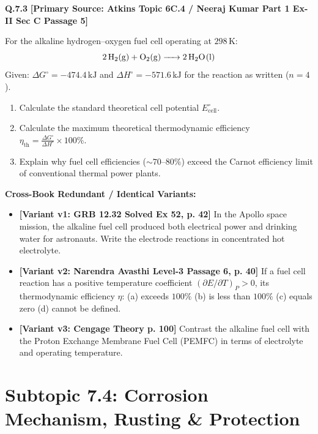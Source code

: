 \begin{problembox}
\textbf{Q.7.3} \hfill \textbf{[Primary Source: Atkins Topic 6C.4 / Neeraj Kumar Part 1 Ex-II Sec C Passage 5]}
\label{q:qb-c7-03}

For the alkaline hydrogen--oxygen fuel cell operating at $298\,\text{K}$:
\begin{equation*}
    \ce{2H2(g) + O2(g) -> 2H2O(l)}
\end{equation*}
Given: $\Delta G^\circ = -474.4\,\text{kJ}$ and $\Delta H^\circ = -571.6\,\text{kJ}$ for the reaction as written ($n = 4$).
\begin{enumerate}[label=(\alph*)]
    \item Calculate the standard theoretical cell potential $E^\circ_{\text{cell}}$.
    \item Calculate the maximum theoretical thermodynamic efficiency $\eta_{\text{th}} = \frac{\Delta G^\circ}{\Delta H^\circ} \times 100\%$.
    \item Explain why fuel cell efficiencies ($\sim 70\text{--}80\%$) exceed the Carnot efficiency limit of conventional thermal power plants.
\end{enumerate}

\tcbline
\textbf{\color{accentamber}Cross-Book Redundant / Identical Variants:}
\begin{itemize}[leftmargin=*,itemsep=2pt]
    \item \textbf{[Variant v1: GRB  12.32 Solved Ex 52, p. 42]} In the Apollo space mission, the alkaline  fuel cell produced both electrical power and drinking water for astronauts. Write the electrode reactions in concentrated hot  electrolyte.
    \item \textbf{[Variant v2: Narendra Avasthi Level-3 Passage 6, p. 40]} If a fuel cell reaction has a positive temperature coefficient $(\partial E/\partial T)_P > 0$, its thermodynamic efficiency $\eta$: (a) exceeds $100\%$ (b) is less than $100\%$ (c) equals zero (d) cannot be defined.
    \item \textbf{[Variant v3: Cengage Theory p. 100]} Contrast the alkaline fuel cell with the Proton Exchange Membrane Fuel Cell (PEMFC) in terms of electrolyte and operating temperature.
\end{itemize}
\end{problembox}

\section{Subtopic 7.4: Corrosion Mechanism, Rusting \& Protection}

